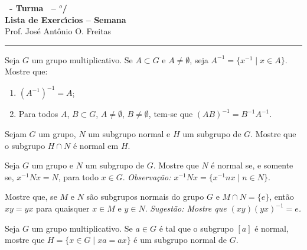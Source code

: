 \documentclass[12pt]{exam}
\begin{document}
\begin{center}

    {\Large\bf \disciplina\ - Turma \turma\ -- \semestre$^{o}$/\ano} \\ \vspace{9pt} {\large\bf
        Lista de Exerc{\'\i}cios -- Semana \numerosemana}\\ \vspace{9pt} Prof. Jos{\'e} Ant{\^o}nio O. Freitas
    \end{center}
    \hrule

    \vspace{.6cm}

    \questao{} Seja $G$ um grupo multiplicativo. Se $A \subset G$ e $A \ne \emptyset$, seja $A^{-1} = \{x^{-1} \mid x \in A\}$. Mostre que:
    \begin{enumerate}[label=({\alph*})]
      \item $(A^{-1})^{-1} = A$;

      \item Para todos $A$, $B \subset G$, $A \ne \emptyset$, $B \ne \emptyset$, tem-se que $(AB)^{-1} = B^{-1}A^{-1}$.
    \end{enumerate}

    \vspace{.3cm}

    \questao{} Sejam $G$ um grupo, $N$ um subgrupo normal e $H$ um subgrupo de $G$. Mostre que o subgrupo $H \cap N$ \'e normal em $H$.

    \vspace{.3cm}

    \questao{} Seja $G$ um grupo e $N$ um subgrupo de $G$. Mostre que $N$ \'e normal se, e somente se, $x^{-1}Nx = N$, para todo $x \in G$.
    \noindent\textit{Observa\c{c}\~ao: $x^{-1}Nx = \{x^{-1}nx \mid n \in N\}$}.

    \vspace{.3cm}

    \questao{} Mostre que, se $M$ e $N$ s\~ao subgrupos normais do grupo $G$ e $M \cap N = \{e\}$, ent\~ao $xy = yx$ para quaisquer $x \in M$ e $y \in N$.
    \noindent \textit{Sugest\~ao: Mostre que $(xy)(yx)^{-1} = e$.}

    \vspace{.3cm}

    \questao{} Seja $G$ um grupo multiplicativo. Se $a \in G$ é tal que o subgrupo $[a]$ é normal, mostre que $H = \{x \in G \mid xa = ax\}$ \'e um subgrupo normal de $G$.

    \vspace{.3cm}
\end{document}
